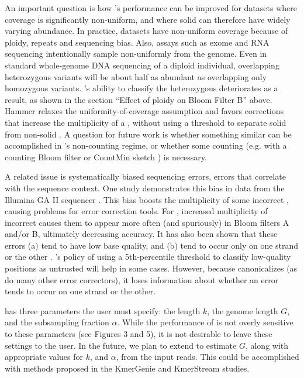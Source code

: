 \documentclass{bmcart}
\begin{document}
An important question is how \tool's performance can be improved for datasets where coverage is significantly non-uniform, and where solid \kmers can therefore have widely varying abundance.
In practice, datasets have non-uniform coverage because of ploidy, repeats and sequencing bias.
Also, assays such as exome and RNA sequencing intentionally sample non-uniformly from the genome.
Even in standard whole-genome DNA sequencing of a diploid individual, \kmers overlapping heterozygous variants will be about half as abundant as \kmers overlapping only homozygous variants.
\tool's ability to classify the heterozygous \kmers deteriorates as a result, as shown in the section ``Effect of ploidy on Bloom Filter B'' above.
Hammer \cite{medvedev2011error} relaxes the uniformity-of-coverage assumption and favors corrections that increase the multiplicity of a \kmer, without using a threshold to separate solid from non-solid \kmers.
A question for future work is whether something similar can be accomplished in \tool's non-counting regime, or whether some counting (e.g. with a counting Bloom filter \cite{fan2000summary, bonomi2006improved} or CountMin sketch \cite{cormode2005improved}) is necessary.

A related issue is systematically biased sequencing errors, \thatis errors that correlate with the sequence context.
One study demonstrates this bias in data from the Illumina GA II sequencer \cite{nakamura2011sequence}.
This bias boosts the multiplicity of some incorrect \kmers, causing problems for error correction tools.
For \tool, increased multiplicity of incorrect \kmers causes them to appear more often (and spuriously) in Bloom filters A and/or B, ultimately decreasing accuracy.
It has also been shown that these errors (a) tend to have low base quality, and (b) tend to occur only on one strand or the other \cite{nakamura2011sequence}.
\tool's policy of using a 5th-percentile threshold to classify low-quality positions as untrusted will help in some cases.
However, because \tool canonicalizes \kmers (as do many other error correctors), it loses information about whether an error tends to occur on one strand or the other.

\tool has three parameters the user must specify: the \kmer length $k$, the genome length $G$, and the subsampling fraction $\alpha$.
While the performance of \tool is not overly sensitive to these parameters (see Figures 3 and 5), it is not desirable to leave these settings to the user.
In the future, we plan to extend \tool to estimate $G$, along with appropriate values for $k$, and $\alpha$, from the input reads.
This could be accomplished with methods proposed in the KmerGenie \cite{chikhi2014informed} and KmerStream \cite{melsted2014kmerstream} studies.
\end{document}
